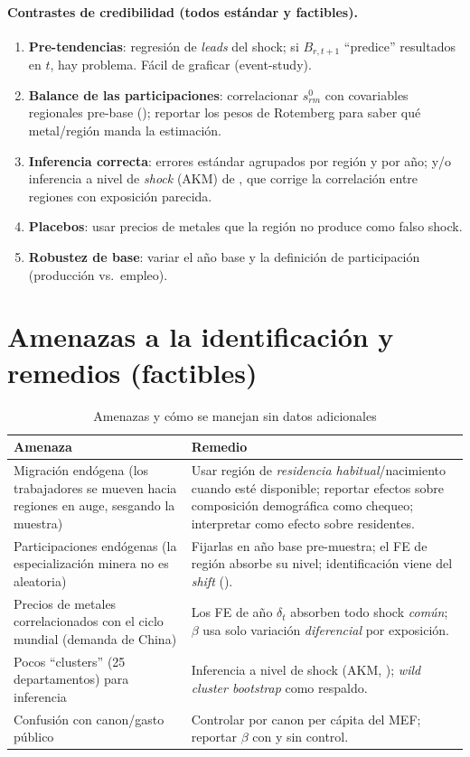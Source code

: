 \documentclass[11pt]{article}
\begin{document}
\paragraph{Contrastes de credibilidad (todos estándar y factibles).}
\begin{enumerate}[leftmargin=1.6em, itemsep=1pt]
  \item \textbf{Pre-tendencias}: regresión de \emph{leads} del shock; si $B_{r,t+1}$ ``predice''
  resultados en $t$, hay problema. Fácil de graficar (event-study).
  \item \textbf{Balance de las participaciones}: correlacionar $s_{rm}^{0}$ con covariables
  regionales pre-base (\citealp{goldsmith2020}); reportar los pesos de Rotemberg para saber
  qué metal/región manda la estimación.
  \item \textbf{Inferencia correcta}: errores estándar agrupados por región y por año; y/o
  inferencia a nivel de \emph{shock} (AKM) de \citet{adao2019}, que corrige la correlación
  entre regiones con exposición parecida.
  \item \textbf{Placebos}: usar precios de metales que la región no produce como falso shock.
  \item \textbf{Robustez de base}: variar el año base y la definición de participación
  (producción vs.\ empleo).
\end{enumerate}

\section{Amenazas a la identificación y remedios (factibles)}

\begin{table}[h]
\centering
\small
\caption{Amenazas y cómo se manejan sin datos adicionales}
\begin{tabular}{p{4.6cm} p{9.6cm}}
\toprule
\textbf{Amenaza} & \textbf{Remedio} \\
\midrule
Migración endógena (los trabajadores se mueven hacia regiones en auge, sesgando la muestra) &
Usar región de \emph{residencia habitual}/nacimiento cuando esté disponible; reportar efectos
sobre composición demográfica como chequeo; interpretar como efecto sobre residentes. \\
\addlinespace
Participaciones endógenas (la especialización minera no es aleatoria) & Fijarlas en año base
pre-muestra; el FE de región absorbe su nivel; identificación viene del \textit{shift}
(\citealp{borusyak2022}). \\
\addlinespace
Precios de metales correlacionados con el ciclo mundial (demanda de China) & Los FE de año
$\delta_t$ absorben todo shock \emph{común}; $\beta$ usa solo variación \emph{diferencial} por
exposición. \\
\addlinespace
Pocos ``clusters'' (25 departamentos) para inferencia & Inferencia a nivel de shock (AKM,
\citealp{adao2019}); \textit{wild cluster bootstrap} como respaldo. \\
\addlinespace
Confusión con canon/gasto público & Controlar por canon per cápita del MEF; reportar $\beta$
con y sin control. \\
\bottomrule
\end{tabular}
\end{table}
\end{document}
